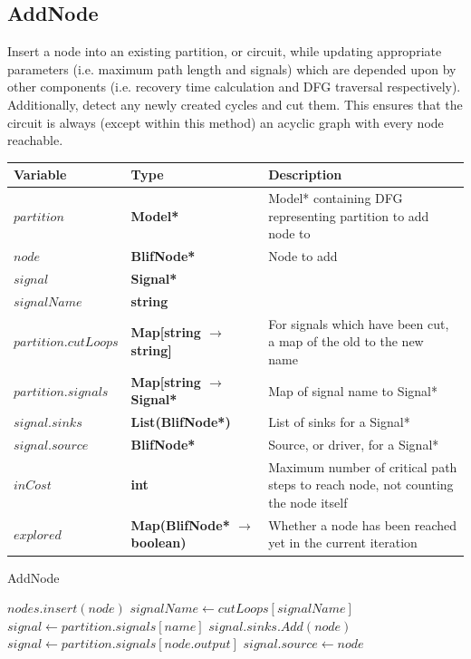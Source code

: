 \documentclass[12pt,final,oneside]{article} %
\begin{document}
\newpage
\subsection{AddNode}
Insert a node into an existing partition, or circuit, while updating appropriate parameters (i.e. maximum path length and signals) which are depended upon by other components (i.e. recovery time calculation and \ac{DFG} traversal respectively).
Additionally, detect any newly created cycles and cut them.
This ensures that the circuit is always (except within this method) an acyclic graph with every node reachable.
\begin{algorithm}
    \begin{center}
        \begin{tabularx}{\linewidth}{llX}
        \toprule
        Variable & Type & Description\\
        \midrule
        $partition$ &\bf  Model* & Model* containing DFG representing partition to add node to\\
        $node$ &\bf  BlifNode* & Node to add\\
        $signal$ &\bf  Signal* & \\
        $signalName$ &\bf  string & \\
        $partition.cutLoops$ &\bf  Map[string $\to$ string] & For signals which have been cut, a map of the old to the new name\\
        $partition.signals$ &\bf  Map[string $\to$ Signal* & Map of signal name to Signal* \\
        $signal.sinks$ &\bf  List(BlifNode*) & List of sinks for a Signal* \\
        $signal.source$ &\bf  BlifNode* & Source, or driver, for a Signal* \\
        $inCost$ &\bf  int & Maximum number of critical path steps to reach node, not counting the node itself \\
        $explored$ &\bf  Map(BlifNode* $\to$ boolean) & Whether a node has been reached yet in the current iteration \\ 
        \bottomrule
        \end{tabularx}
    \end{center}
   \caption{AddNode}\label{addnode}
   \begin{algorithmic}[1]
            \State $nodes.insert(node)$
                  \State $signalName \gets cutLoops[signalName]$ 
               \EndIf
               \State $signal \gets partition.signals[name]$
               \State $signal.sinks.Add(node)$
            \EndFor
            \State $signal \gets partition.signals[node.output]$
            \State $signal.source \gets node$


\end{algorithmic}
\end{algorithm}
\end{document}
